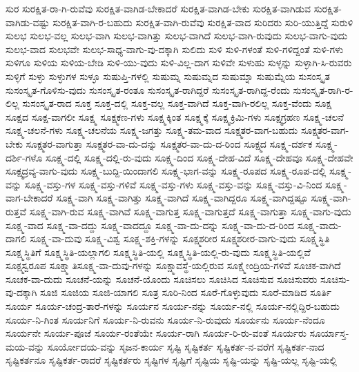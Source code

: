 {ಸುರ
ಸುರಕ್ಷಿತ-ರಾ-ಗಿ-ರುವೆವು
ಸುರಕ್ಷಿತ-ವಾಗಿಡ-ಬೇಕಾದರೆ
ಸುರಕ್ಷಿತ-ವಾಗಿಡ-ಬೇಕು
ಸುರಕ್ಷಿತ-ವಾಗಿಡುವ
ಸುರಕ್ಷಿತ-ವಾಗಿಡು-ವಷ್ಟು
ಸುರಕ್ಷಿತ-ವಾಗಿ-ರ-ಬಹುದು
ಸುರಕ್ಷಿತ-ವಾಗಿ-ರುವೆವು
ಸುರಕ್ಷಿತ-ವಾದ
ಸುರಿದರು
ಸುರಿ-ಯುತ್ತಿದ್ದೆ
ಸುರುಳಿ
ಸುಲಭ
ಸುಲಭ-ವಲ್ಲ
ಸುಲಭ-ವಾಗಿ
ಸುಲಭ-ವಾಗಿತ್ತು
ಸುಲಭ-ವಾಗಿದೆ
ಸುಲಭ-ವಾಗಿ-ರುವುದು
ಸುಲಭ-ವಾಗು-ವುದು
ಸುಲಭ-ವಾದ
ಸುಲಭವೇ
ಸುಲಭ-ಸಾಧ್ಯ-ವಾಗು-ವು-ದಕ್ಕಾಗಿ
ಸುಲಿದು
ಸುಳಿ
ಸುಳಿ-ಗಳಂತೆ
ಸುಳಿ-ಗಳಿದ್ದಂತೆ
ಸುಳಿ-ಗಳು
ಸುಳಿಗೂ
ಸುಳಿಯ
ಸುಳಿಯ-ಬೇಡಿ
ಸುಳಿ-ಯು-ವುದು
ಸುಳಿ-ವಿಲ್ಲ-ದಾಗ
ಸುಳಿವೇ
ಸುಳುಹು
ಸುಳ್ಳನ್ನು
ಸುಳ್ಳಾಗಿ-ಸಿ-ರುವರು
ಸುಳ್ಳಿಗೆ
ಸುಳ್ಳು
ಸುಳ್ಳುಗಳ
ಸುಳ್ಳೂ
ಸುಷುಪ್ತಿ-ಗಳಲ್ಲಿ
ಸುಷುಮ್ನ
ಸುಷುಮ್ನದ
ಸುಷುಮ್ನಾ
ಸುಷುಮ್ನೆಯ
ಸುಸಂಸ್ಕೃತ
ಸುಸಂಸ್ಕೃತ-ಗೊಳಿಸು-ವುದು
ಸುಸಂಸ್ಕೃತ-ರಂತೂ
ಸುಸಂಸ್ಕೃತ-ರಾಗಿದ್ದರೆ
ಸುಸಂಸ್ಕೃತ-ರಾಗಿದ್ದ-ರೆಂದು
ಸುಸಂಸ್ಕೃತ-ರಾಗಿ-ರ-ಲಿಲ್ಲ
ಸುಸಂಸ್ಕೃತ-ರಾದ
ಸೂಕ್ತ
ಸೂಕ್ತ-ದಲ್ಲಿ
ಸೂಕ್ತ-ವಲ್ಲ
ಸೂಕ್ತ-ವಾಗಿದೆ
ಸೂಕ್ತ-ವಾಗಿ-ರಲಿಲ್ಲ
ಸೂಕ್ತ-ವೆಂದು
ಸೂಕ್ಷ
ಸೂಕ್ಷದ
ಸೂಕ್ಷ-ವಾಗಲೀ
ಸೂಕ್ಷ್ಮ
ಸೂಕ್ಷ್ಮಕಣ-ಗಳು
ಸೂಕ್ಷ್ಮಕ್ಕಿಂತ
ಸೂಕ್ಷ್ಮಕ್ಕೆ
ಸೂಕ್ಷ್ಮಕ್ರಿಮಿ-ಗಳು
ಸೂಕ್ಷ್ಮಗ್ರಹಣ
ಸೂಕ್ಷ್ಮ-ಚಲನೆ
ಸೂಕ್ಷ್ಮ-ಚಲನೆ-ಗಳು
ಸೂಕ್ಷ್ಮ-ಚಲನೆಯ
ಸೂಕ್ಷ್ಮ-ಜಗತ್ತು
ಸೂಕ್ಷ್ಮ-ತಮ-ವಾದ
ಸೂಕ್ಷ್ಮತರ-ವಾಗ-ಬಹುದು
ಸೂಕ್ಷ್ಮತರ-ವಾಗ-ಬೇಕು
ಸೂಕ್ಷ್ಮತರ-ವಾಗುತ್ತಾ
ಸೂಕ್ಷ್ಮತರ-ವಾ-ದು-ದನ್ನು
ಸೂಕ್ಷ್ಮತರ-ವಾ-ದು-ದ-ರಿಂದ
ಸೂಕ್ಷ್ಮದ
ಸೂಕ್ಷ್ಮ-ದರ್ಶಕ
ಸೂಕ್ಷ್ಮ-ದರ್ಶಿ-ಗಳೊ
ಸೂಕ್ಷ್ಮ-ದಲ್ಲಿ
ಸೂಕ್ಷ್ಮ-ದಲ್ಲಿ-ರು-ವುದು
ಸೂಕ್ಷ್ಮ-ದಿಂದ
ಸೂಕ್ಷ್ಮ-ದೇಹ-ವಿದೆ
ಸೂಕ್ಷ್ಮ-ದೇಹವೂ
ಸೂಕ್ಷ್ಮ-ದೇಹವೇ
ಸೂಕ್ಷ್ಮದ್ರವ್ಯ-ವಾಗು-ವುದು
ಸೂಕ್ಷ್ಮ-ಬುದ್ದಿ-ಯಿಂದಾಗಲಿ
ಸೂಕ್ಷ್ಮ-ಭಾಗ-ವನ್ನು
ಸೂಕ್ಷ್ಮ-ರೂಪದ
ಸೂಕ್ಷ್ಮ-ರೂಪ-ದಲ್ಲಿ
ಸೂಕ್ಷ್ಮ-ವನ್ನು
ಸೂಕ್ಷ್ಮ-ವಸ್ತು-ಗಳ
ಸೂಕ್ಷ್ಮ-ವಸ್ತು-ಗಳಿವೆ
ಸೂಕ್ಷ್ಮ-ವಸ್ತು-ಗಳು
ಸೂಕ್ಷ್ಮ-ವಸ್ತು-ವನ್ನು
ಸೂಕ್ಷ್ಮ-ವಸ್ತು-ವಿ-ನಿಂದ
ಸೂಕ್ಷ್ಮ-ವಾಗ-ಬೇಕಾದರೆ
ಸೂಕ್ಷ್ಮ-ವಾಗಿ
ಸೂಕ್ಷ್ಮ-ವಾಗಿತ್ತು
ಸೂಕ್ಷ್ಮ-ವಾಗಿದೆ
ಸೂಕ್ಷ್ಮ-ವಾಗಿದ್ದರೂ
ಸೂಕ್ಷ್ಮ-ವಾಗಿದ್ದಷ್ಟೂ
ಸೂಕ್ಷ್ಮ-ವಾಗಿ-ರುತ್ತವೆ
ಸೂಕ್ಷ್ಮ-ವಾಗಿ-ರುವ
ಸೂಕ್ಷ್ಮ-ವಾಗಿವೆ
ಸೂಕ್ಷ್ಮ-ವಾಗುತ್ತ
ಸೂಕ್ಷ್ಮ-ವಾಗುತ್ತದೆ
ಸೂಕ್ಷ್ಮ-ವಾಗುತ್ತಾ
ಸೂಕ್ಷ್ಮ-ವಾಗು-ವುದು
ಸೂಕ್ಷ್ಮ-ವಾದ
ಸೂಕ್ಷ್ಮ-ವಾ-ದದ್ದು
ಸೂಕ್ಷ್ಮ-ವಾದದ್ದೂ
ಸೂಕ್ಷ್ಮ-ವಾ-ದು-ದನ್ನು
ಸೂಕ್ಷ್ಮ-ವಾ-ದು-ದ-ರಿಂದ
ಸೂಕ್ಷ್ಮ-ವಾದು-ದಾಗಲಿ
ಸೂಕ್ಷ್ಮ-ವಾ-ದುವು
ಸೂಕ್ಷ್ಮ-ವಿಶ್ವ
ಸೂಕ್ಷ್ಮ-ಶಕ್ತಿ-ಗಳನ್ನು
ಸೂಕ್ಷ್ಮಶರೀರ
ಸೂಕ್ಷ್ಮಶರೀರ-ವಾಗು-ವುದು
ಸೂಕ್ಷ್ಮಸ್ಥಿತಿ
ಸೂಕ್ಷ್ಮಸ್ಥಿತಿಗೆ
ಸೂಕ್ಷ್ಮಸ್ಥಿತಿ-ಯಲ್ಲಾಗಲಿ
ಸೂಕ್ಷ್ಮಸ್ಥಿತಿ-ಯಲ್ಲಿ
ಸೂಕ್ಷ್ಮಸ್ಥಿತಿ-ಯಲ್ಲಿ-ರು-ವುದು
ಸೂಕ್ಷ್ಮಸ್ಥಿತಿ-ಯಲ್ಲಿವೆ
ಸೂಕ್ಷ್ಮಸ್ವರೂಪ
ಸೂಕ್ಷ್ಮಾತಿಸೂಕ್ಷ್ಮ-ವಾ-ದುವು-ಗಳನ್ನು
ಸೂಕ್ಷ್ಮಾವಸ್ಥೆ-ಯಲ್ಲಿರುವ
ಸೂಕ್ಷ್ಮೇಂದ್ರಿಯ-ಗಳಿವೆ
ಸೂಚಕ-ವಾಗಿದೆ
ಸೂಚಕ-ವಾ-ದುದು
ಸೂಚನೆ-ಯನ್ನು
ಸೂಚನೆ-ಯೊಂದು
ಸೂಚಿಸಲು
ಸೂಚಿಸಿದ
ಸೂಚಿಸುವ
ಸೂಚಿಸುವರು
ಸೂಚಿಸು-ವು-ದಕ್ಕಾಗಿ
ಸೂಜಿ
ಸೂಜಿಯ
ಸೂಜಿ-ಯಾಗಲಿ
ಸೂತ್ರ
ಸೂರಿ-ನಿಂದ
ಸೂರೆ-ಗೊಳ್ಳುವುದು
ಸೂರೆ-ಮಾಡಿದ
ಸೂರ್ತಿ
ಸೂರ್ಯ
ಸೂರ್ಯ-ಚಂದ್ರ-ತಾರೆ-ಗಳನ್ನು
ಸೂರ್ಯನ
ಸೂರ್ಯ-ನನ್ನು
ಸೂರ್ಯ-ನಲ್ಲಿ
ಸೂರ್ಯ-ನಲ್ಲಿದ್ದಿರ-ಬಹುದು
ಸೂರ್ಯ-ನಿ-ಗಿಂತ
ಸೂರ್ಯನಿಗೆ
ಸೂರ್ಯ-ನಿ-ರುವನು
ಸೂರ್ಯ-ನಿ-ರುವುದು
ಸೂರ್ಯನು
ಸೂರ್ಯ-ನೆಂದೂ
ಸೂರ್ಯನೇ
ಸೂರ್ಯ-ಪೂಜೆ
ಸೂರ್ಯ-ರಂತೆಯೇ
ಸೂರ್ಯ-ರಾಗಿ
ಸೂರ್ಯ-ರಿ-ರು-ವಂತೆ
ಸೂರ್ಯರು
ಸೂರ್ಯಾಸ್ತ-ಮಯ-ವನ್ನು
ಸೂರ್ಯೋದಯ-ವನ್ನು
ಸೃಜನ-ಕಾರ್ಯ
ಸೃಷ್ಟಿ
ಸೃಷ್ಟಿಕರ್ತ
ಸೃಷ್ಟಿಕರ್ತ-ನ-ವರೆಗೆ
ಸೃಷ್ಟಿಕರ್ತ-ನಾದ
ಸೃಷ್ಟಿಕರ್ತನೂ
ಸೃಷ್ಟಿಕರ್ತ-ರಾದರೆ
ಸೃಷ್ಟಿಕರ್ತರು
ಸೃಷ್ಟಿಗಳ
ಸೃಷ್ಟಿಗೆ
ಸೃಷ್ಟಿಯ
ಸೃಷ್ಟಿ-ಯನ್ನು
ಸೃಷ್ಟಿ-ಯಲ್ಲ
ಸೃಷ್ಟಿ-ಯಲ್ಲಿ
}
